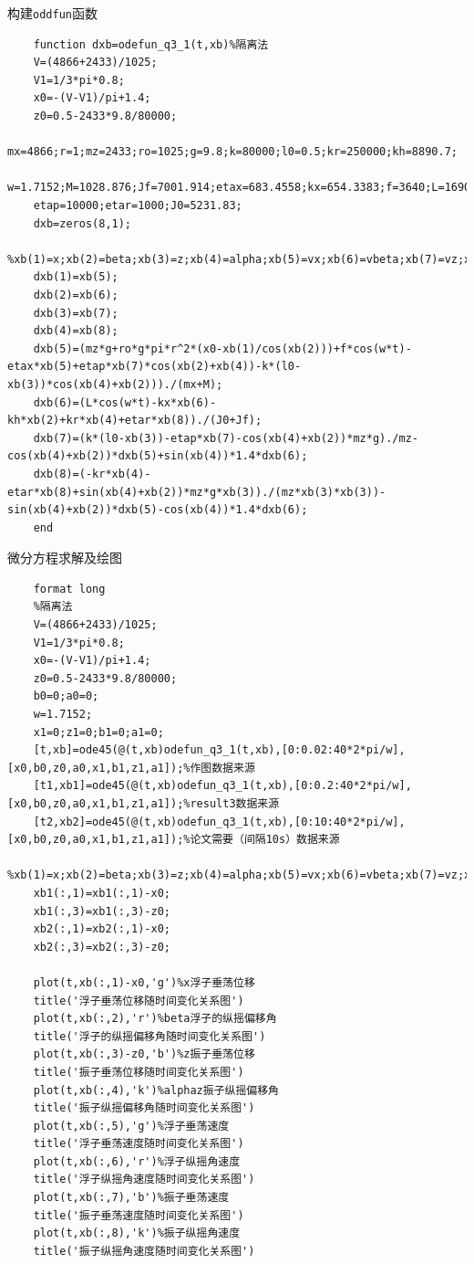\documentclass{article}
\numberwithin{equation}{subsection}
\begin{document}
构建\verb|oddfun|函数
\begin{lstlisting}
    function dxb=odefun_q3_1(t,xb)%隔离法
    V=(4866+2433)/1025; 
    V1=1/3*pi*0.8; 
    x0=-(V-V1)/pi+1.4;
    z0=0.5-2433*9.8/80000;
    mx=4866;r=1;mz=2433;ro=1025;g=9.8;k=80000;l0=0.5;kr=250000;kh=8890.7;
    w=1.7152;M=1028.876;Jf=7001.914;etax=683.4558;kx=654.3383;f=3640;L=1690;
    etap=10000;etar=1000;J0=5231.83;
    dxb=zeros(8,1);
    %xb(1)=x;xb(2)=beta;xb(3)=z;xb(4)=alpha;xb(5)=vx;xb(6)=vbeta;xb(7)=vz;xb(8)=valpha;
    dxb(1)=xb(5);
    dxb(2)=xb(6);
    dxb(3)=xb(7);
    dxb(4)=xb(8);
    dxb(5)=(mz*g+ro*g*pi*r^2*(x0-xb(1)/cos(xb(2)))+f*cos(w*t)-etax*xb(5)+etap*xb(7)*cos(xb(2)+xb(4))-k*(l0-xb(3))*cos(xb(4)+xb(2)))./(mx+M);
    dxb(6)=(L*cos(w*t)-kx*xb(6)-kh*xb(2)+kr*xb(4)+etar*xb(8))./(J0+Jf);
    dxb(7)=(k*(l0-xb(3))-etap*xb(7)-cos(xb(4)+xb(2))*mz*g)./mz-cos(xb(4)+xb(2))*dxb(5)+sin(xb(4))*1.4*dxb(6);
    dxb(8)=(-kr*xb(4)-etar*xb(8)+sin(xb(4)+xb(2))*mz*g*xb(3))./(mz*xb(3)*xb(3))-sin(xb(4)+xb(2))*dxb(5)-cos(xb(4))*1.4*dxb(6);
    end
\end{lstlisting}
微分方程求解及绘图
\begin{lstlisting}
    format long
    %隔离法
    V=(4866+2433)/1025; 
    V1=1/3*pi*0.8; 
    x0=-(V-V1)/pi+1.4;
    z0=0.5-2433*9.8/80000;
    b0=0;a0=0;
    w=1.7152;
    x1=0;z1=0;b1=0;a1=0;
    [t,xb]=ode45(@(t,xb)odefun_q3_1(t,xb),[0:0.02:40*2*pi/w],[x0,b0,z0,a0,x1,b1,z1,a1]);%作图数据来源
    [t1,xb1]=ode45(@(t,xb)odefun_q3_1(t,xb),[0:0.2:40*2*pi/w],[x0,b0,z0,a0,x1,b1,z1,a1]);%result3数据来源
    [t2,xb2]=ode45(@(t,xb)odefun_q3_1(t,xb),[0:10:40*2*pi/w],[x0,b0,z0,a0,x1,b1,z1,a1]);%论文需要（间隔10s）数据来源
    %xb(1)=x;xb(2)=beta;xb(3)=z;xb(4)=alpha;xb(5)=vx;xb(6)=vbeta;xb(7)=vz;xb(8)=valpha;
    xb1(:,1)=xb1(:,1)-x0;
    xb1(:,3)=xb1(:,3)-z0;
    xb2(:,1)=xb2(:,1)-x0;
    xb2(:,3)=xb2(:,3)-z0;

    plot(t,xb(:,1)-x0,'g')%x浮子垂荡位移
    title('浮子垂荡位移随时间变化关系图')
    plot(t,xb(:,2),'r')%beta浮子的纵摇偏移角
    title('浮子的纵摇偏移角随时间变化关系图')
    plot(t,xb(:,3)-z0,'b')%z振子垂荡位移
    title('振子垂荡位移随时间变化关系图')
    plot(t,xb(:,4),'k')%alphaz振子纵摇偏移角
    title('振子纵摇偏移角随时间变化关系图')
    plot(t,xb(:,5),'g')%浮子垂荡速度
    title('浮子垂荡速度随时间变化关系图')
    plot(t,xb(:,6),'r')%浮子纵摇角速度
    title('浮子纵摇角速度随时间变化关系图')
    plot(t,xb(:,7),'b')%振子垂荡速度
    title('振子垂荡速度随时间变化关系图')
    plot(t,xb(:,8),'k')%振子纵摇角速度
    title('振子纵摇角速度随时间变化关系图')
\end{lstlisting}
\end{document}
